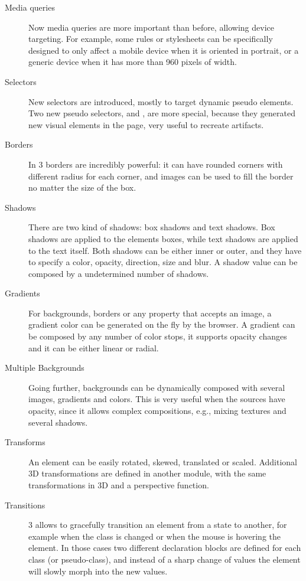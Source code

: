 \begin{description}
  \item[Media queries] Now media queries are more important than before, allowing device targeting.
  For example, some rules or stylesheets can be specifically designed to only affect a mobile device when it is oriented in portrait, or a generic device when it has more than 960 pixels of width.
  \item[Selectors] New selectors are introduced, mostly to target dynamic pseudo elements.
  Two new pseudo selectors,  and , are more special, because they generated new visual elements in the page, very useful to recreate artifacts.
  \item[Borders] In  3 borders are incredibly powerful: it can have rounded corners with different radius for each corner, and images can be used to fill the border no matter the size of the box.
  \item[Shadows] There are two kind of shadows: box shadows and text shadows.
  Box shadows are applied to the elements boxes, while text shadows are applied to the text itself.
  Both shadows can be either inner or outer, and they have to specify a color, opacity, direction, size and blur.
  A shadow value can be composed by a undetermined number of shadows.
  \item[Gradients] For backgrounds, borders or any property that accepts an image, a gradient color can be generated on the fly by the browser.
  A gradient can be composed by any number of color stops, it supports opacity changes and it can be either linear or radial.
  \item[Multiple Backgrounds] Going further, backgrounds can be dynamically composed with several images, gradients and colors.
  This is very useful when the sources have opacity, since it allows complex compositions, e.g., mixing textures and several shadows.
  \item[Transforms] An element can be easily rotated, skewed, translated or scaled.
  Additional 3D transformations are defined in another  module, with the same transformations in 3D and a perspective function.
  \item[Transitions]  3 allows to gracefully transition an element from a state to another, for example when the class is changed or when the mouse is hovering the element.
  In those cases two different declaration blocks are defined for each class (or pseudo-class), and instead of a sharp change of values the element will slowly morph into the new values.

\end{description}

